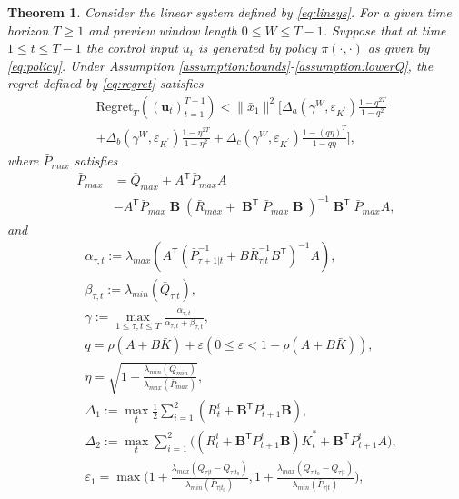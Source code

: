 \documentclass[letterpaper, 10 pt, conference]{ieeeconf}  %
\newcommand{\transpose}{\mathsf{T}}
\DeclareMathOperator{\contB}{\mathbf{B}}
\newtheorem{theorem}{Theorem}
\begin{document}
\begin{theorem}\label{thm:main}
Consider the linear system defined by \eqref{eq:linsys}. For a given time horizon $T \geq 1$ and preview window length $0 \leq W \leq T-1$. Suppose that at time $1 \leq t \leq T-1$ the control input $u_t$ is generated by policy $\pi(\cdot,\cdot)$ as given by \eqref{eq:policy}. Under Assumption \ref{assumption:bounds}-\ref{assumption:lowerQ}, the regret defined by \eqref{eq:regret} satisfies
    \begin{align*}
        &\text{Regret}_{T}((\mathbf{u}_{t})_{t=1}^{T-1})< \|\bar{x}_{1}\|^{2}\bigg[\Delta_{a}(\gamma^{W},\varepsilon_{K^{'}})\frac{1-q^{2T}}{1-q^{2}}\\
        &+  \Delta_{b}(\gamma^{W},\varepsilon_{K^{'}})\frac{1-\eta^{2T}}{1-\eta^{2}}+ \Delta_{c}(\gamma^{W},\varepsilon_{K^{'}})\frac{1-(q\eta)^{T}}{1-q\eta}\bigg],
    \end{align*}
    where $\bar{P}_{max}$ satisfies
    \begin{align*}
        \bar{P}_{max} &= \bar{Q}_{max} + A^{\transpose}\bar{P}_{max}A \\
        &- A^{\transpose}\bar{P}_{max}\contB(\bar{R}_{max}+\contB^{\transpose}\bar{P}_{max}\contB)^{-1}\contB^{\transpose}\bar{P}_{max}A,
    \end{align*}
    and
    \begin{align*}
        &\alpha_{\tau,t} := \lambda_{max}(A^{\transpose}(\bar{P}_{\tau+1|t}^{-1}+B\bar{R}_{\tau|t}^{-1}B^{\transpose})^{-1}A),\\
        &\beta_{\tau,t} := \lambda_{min}(\bar{Q}_{\tau|t}),\\ 
        &\gamma := \max_{1\leq \tau,t \leq T} \frac{\alpha_{\tau,t}}{\alpha_{\tau,t}+\beta_{\tau,t}},\\
        &q = \rho(A+B\bar{K}) + \varepsilon(0\leq \varepsilon < 1-\rho(A+B\bar{K})),\\
        &\eta = \sqrt{1-\frac{\lambda_{min}(\bar{Q}_{min})}{\lambda_{max}(\bar{P}_{max})}},\\
        &\Delta_{1} := \max_{t} \frac{1}{2}\sum_{i=1}^{2}(R_{t}^{i}+\mathbf{B}^{\transpose}P_{t+1}^{i}\mathbf{B}),\\
        &\Delta_{2} := \max_{t} \sum_{i=1}^{2}\bigg( (R_{t}^{i}+\mathbf{B}^{\transpose}P_{t+1}^{i}\mathbf{B})\bar{K}_{t}^{*}+\mathbf{B}^{\transpose}P_{t+1}^{i}A\bigg),\\
        &\varepsilon_{1} = \max\bigg(1+\frac{\lambda_{max}(Q_{\tau|t}-Q_{\tau|t_{0}})}{\lambda_{min}(\bar{P}_{\tau|t_{0}})},1+\frac{\lambda_{max}(Q_{\tau|t_{0}}-Q_{\tau|t})}{\lambda_{min}(\bar{P}_{\tau|t})}\bigg),\\

\end{align*}
\end{theorem}
\end{document}
